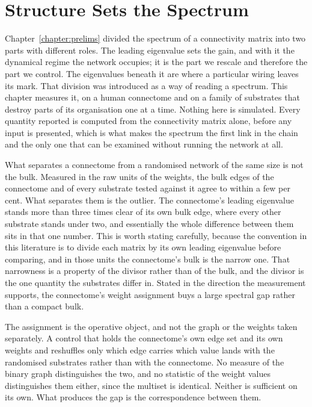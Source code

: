 \chapter{Structure Sets the Spectrum}
\label{chapter:act-I}


Chapter~\ref{chapter:prelims} divided the spectrum of a connectivity matrix into
two parts with different roles. The leading eigenvalue sets the gain, and with it
the dynamical regime the network occupies; it is the part we rescale and
therefore the part we control. The eigenvalues beneath it are where a particular
wiring leaves its mark. That division was introduced as a way of reading a
spectrum. This chapter measures it, on a human connectome and on a family of
substrates that destroy parts of its organisation one at a time. Nothing here is
simulated. Every quantity reported is computed from the connectivity matrix
alone, before any input is presented, which is what makes the spectrum the first
link in the chain and the only one that can be examined without running the
network at all.

What separates a connectome from a randomised network of the same size is not
the bulk. Measured in the raw units of the weights, the bulk edges of the
connectome and of every substrate tested against it agree to within a few per
cent. What separates them is the outlier. The connectome's leading eigenvalue
stands more than three times clear of its own bulk edge, where every other
substrate stands under two, and essentially the whole difference between them
sits in that one number. This is worth stating carefully, because the convention
in this literature is to divide each matrix by its own leading eigenvalue before
comparing, and in those units the connectome's bulk is the narrow one. That
narrowness is a property of the divisor rather than of the bulk, and the divisor
is the one quantity the substrates differ in. Stated in the direction the
measurement supports, the connectome's weight assignment buys a large spectral
gap rather than a compact bulk.

The assignment is the operative object, and not the graph or the weights taken
separately. A control that holds the connectome's own edge set and its own
weights and reshuffles only which edge carries which value lands with the
randomised substrates rather than with the connectome. No measure of the binary
graph distinguishes the two, and no statistic of the weight values distinguishes
them either, since the multiset is identical. Neither is sufficient on its own.
What produces the gap is the correspondence between them.


